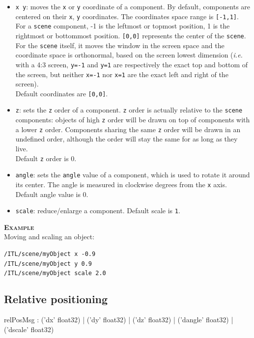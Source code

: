 \documentclass[a4paper,twoside]{report}
\newcommand{\subsublevel}[1]	{\subsection{#1}}
\newcommand{\OSC}[1]		{\texttt{#1}}
\newcommand{\values}[1]	{\texttt{#1}}
\newcommand{\example}		{\textbf{\hspace{-1.5cm}\textbf{\textsc{Example }}}}
\newcommand{\sample}	[1]			{\vspace{-2mm}\begin{center}\colorbox{mygrey}{
								\begin{minipage}[t]{0.9\columnwidth} 
								{\small \texttt{#1}}
								\end{minipage}}\end{center}}
\begin{document}
\begin{itemize}
\item \OSC{x y}: moves the \values{x} or \values{y} coordinate of a component. By default, components are centered on their \values{x}, \values{y} coordinates. The coordinates space range is \values{[-1,1]}. \\
For a \OSC{scene} component, -1 is the leftmost or topmost position, 1 is the rightmost or bottommost position. \values{[0,0]} represents the center of the \OSC{scene}. \\
For the \OSC{scene} itself, it moves the window in the screen space and the coordinate space is orthonormal, based on the screen lowest dimension (\emph{i.e.} with a 4:3 screen, \OSC{y=-1} and \OSC{y=1} are respectively the exact top and bottom of the screen, but neither \OSC{x=-1} nor \OSC{x=1} are the exact left and right of the screen). \\
Default coordinates are \values{[0,0]}.
\item \OSC{z}: sets the \values{z} order of a component. \values{z} order is actually relative to the \OSC{scene} components: objects of high \values{z} order will be drawn on top of components with a lower \values{z} order. Components sharing the same \values{z} order will be drawn in an undefined order, although the order will stay the same for as long as they live. \\
Default \values{z} order is 0.
\item \OSC{angle}: sets the \values{angle} value of a component, which is used to rotate it around its center. The angle is measured in clockwise degrees from the \values{x} axis.\\
Default angle value is 0.
\item \OSC{scale}: reduce/enlarge a component. Default scale is \values{1}.
\end{itemize}

\example \\
Moving and scaling an object:
\sample{/ITL/scene/myObject x -0.9 \\
/ITL/scene/myObject y 0.9 \\
/ITL/scene/myObject scale 2.0
}

\subsublevel{Relative positioning}
\label{relpos}

\begin{rail}
relPosMsg :  
			('dx' float32)
		| 	('dy' float32)
		| 	('dz' float32)
		| 	('dangle' float32)
		| 	('dscale' float32) 
\end{rail}
\end{document}
